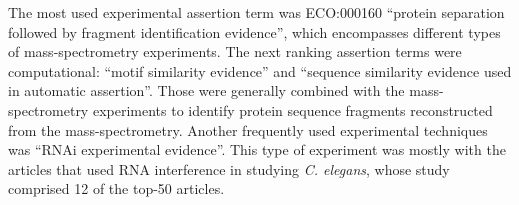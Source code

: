 \documentclass[12pt]{article}
\begin{document}
The most used experimental assertion term was ECO:000160 ``protein separation followed by fragment
identification evidence'', which encompasses different types of mass-spectrometry experiments. The
next ranking assertion terms were computational: ``motif similarity evidence'' and ``sequence
similarity evidence used in automatic assertion''. Those were generally combined with the
mass-spectrometry experiments to identify protein sequence fragments reconstructed from the
mass-spectrometry. Another frequently used experimental techniques was ``RNAi experimental
evidence''. This type of experiment was mostly with the articles that used RNA interference in
studying \textit{C. elegans}, whose study comprised 12 of the top-50 articles.

% 
% 
% 
% 
\end{document}
